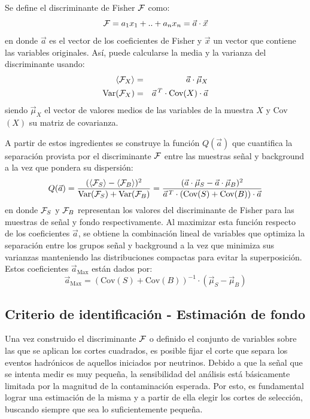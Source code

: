 	Se define el discriminante de Fisher ${\cal F}$ como:
	\begin{equation}
	{\cal F} = a_1 x_1 + .. + a_n x_n = \vec{a}\cdot \vec{x}
	\end{equation}
	en donde $\vec{a}$ es el vector de los coeficientes de Fisher y $\vec{x}$ un vector que contiene las variables originales.
	Así, puede calcularse la media y la varianza del discriminante usando:
	\begin{eqnarray}
	\langle{\cal F}_X\rangle &=& \vec{a}\cdot\vec{\mu}_X \\
	\text{Var}({\cal F}_X)   &=& \vec{a}^{\,T} \cdot \text{Cov}(X) \cdot\vec{a}
	\end{eqnarray}
	siendo $\vec{\mu}_X$ el vector de valores medios de las variables de la muestra $X$ y Cov$(X)$ su matriz de covarianza.

	A partir de estos ingredientes se construye la función $Q(\vec{a})$ que cuantifica la separación provista por el discriminante $\cal{F}$
	entre las muestras señal y background a la vez que pondera su dispersión:
	\begin{equation}
	Q(\vec{a}) = \frac{( \langle{\cal F}_S\rangle - \langle{\cal F}_B \rangle)^2}{\text{Var}({\cal F}_S)+\text{Var}({\cal F}_B)}
	= \frac{(\vec{a}\cdot\vec{\mu}_S  - \vec{a}\cdot\vec{\mu}_B)^2}
					{\vec{a}^{\,T} \cdot (\text{Cov}(S) + \text{Cov}(B) )\cdot\vec{a}} 
	\end{equation}
	en donde ${\cal F}_S$ y ${\cal F}_B$ representan los valores del discriminante de Fisher para las muestras de señal y fondo respectivamente.
	Al maximizar esta función respecto de los coeficientes $\vec{a}$, se obtiene la combinación lineal de variables que optimiza la separación entre los grupos señal y background a la vez que minimiza sus varianzas manteniendo las distribuciones compactas para evitar la superposición. 
	Estos coeficientes $\vec{a}_{\text{Max}}$ están dados por:
	\begin{equation}
	\vec{a}_{\text{Max}} = (\text{Cov}(S) + \text{Cov}(B) )^{-1} \cdot (\vec{\mu}_S - \vec{\mu}_B)   
	\end{equation}
	
	
	\subsection{Criterio de identificación - Estimación de fondo}
	\label{sbsc:fondo}
	
	Una vez construido el discriminante ${\cal F}$ o definido el conjunto de variables sobre las que se aplican los cortes cuadrados, es posible fijar el corte que separa los eventos hadrónicos de aquellos iniciados por neutrinos.
	Debido a que la señal que se intenta medir es muy pequeña, la sensibilidad del análisis está básicamente limitada por la magnitud de la contaminación esperada.
	Por esto, es fundamental lograr una estimación de la misma y a partir de ella elegir los cortes de selección, buscando siempre que sea lo suficientemente pequeña.
	
